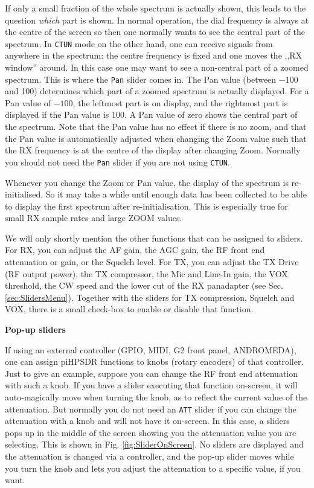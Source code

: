 \documentclass[12pt]{book}
\def\bltt#1{\texttt{\color{blue}#1}}
\def\pH{pi\-HPSDR\xspace}
\begin{document}
If only a small fraction of the whole spectrum is actually shown, this
leads to the question \textit{which} part is shown. In normal operation,
the dial frequency is always at the centre of the screen so then one
normally wants to see the central part of the spectrum. In \bltt{CTUN}
mode on the other hand, one can receive signals from anywhere in the spectrum:
the centre frequency is fixed and one moves the ,,RX window'' around. In
this case one may want to see a non-central part of a zoomed spectrum.
This is where the \bltt{Pan} slider comes in. The Pan value
(between $-100$ and 100) determines which part of a zoomed spectrum
is actually displayed. For a Pan value of $-100$, the leftmost part is
on display, and the rightmost part is displayed if the Pan value is 100.
A Pan value of zero shows the central part of the spectrum. Note that the
Pan value has no effect if there is no zoom, and that the Pan value is
automatically adjusted when changing the Zoom value such that the RX
frequency is at the centre of the display after changing Zoom.
Normally you should not need the \bltt{Pan} slider if you are not using
\bltt{CTUN}.

Whenever you change the Zoom or Pan value, the display of the
spectrum is re-initialised. So it may take a while until enough
data has been collected to be able to display the first
spectrum after re-initialisation. This is especially true
for small RX sample rates and large ZOOM values.

We will only shortly mention the other functions that can be assigned to
sliders. For RX, you can adjust the AF gain, the AGC gain, the RF front
end attenuation or gain, or the Squelch level. For TX, you can adjust
the TX Drive (RF output power), the TX compressor, the Mic and Line-In
gain, the VOX threshold, the CW speed and the lower cut of the
RX panadapter (see Sec. \ref{sec:SlidersMenu}).
Together with the sliders for TX compression, Squelch and VOX, there is
a small check-box to enable or disable that function.

\textbf{Pop-up sliders}

If using an external controller (GPIO, MIDI, G2 front panel, ANDROMEDA), one can
assign \pH functions to knobs (rotary encoders) of that controller. Just to give
an example, suppose you can change the RF front end attenuation with such a knob.
If you have a slider executing that function on-screen, it will auto-magically
move when turning the knob, as to reflect the current value of the attenuation.
But normally you do not need an \bltt{ATT} slider if you can change the attenuation
with a knob and will not have it on-screen. In this case, a sliders pops up
in the middle of the screen showing you the attenuation value you are selecting.
This is shown in Fig. \ref{fig:SliderOnScreen}. No sliders are displayed and the
attenuation is changed via a controller, and the pop-up slider moves while you
turn the knob and lets you adjust the attenuation to a specific value, if you want.
\end{document}
